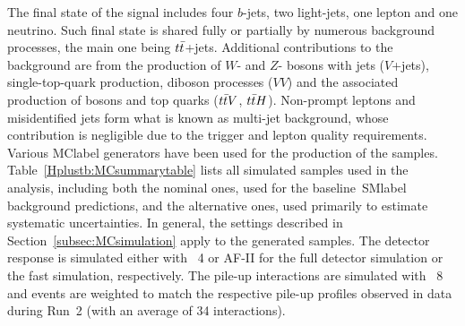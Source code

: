 The final state of the signal includes four $b$-jets, two light-jets, one lepton and one neutrino. Such final state is shared fully or partially by numerous background processes, the main one being $t\bar{t}$+jets. Additional contributions to the background are from the production of $W$- and $Z$- bosons with jets ($V$+jets), single-top-quark production, diboson processes ($VV$) and the associated production of bosons and top quarks ($t\bar{t} V$, $t\bar{t} H$). Non-prompt leptons and misidentified jets form what is known as multi-jet background, whose contribution is negligible due to the trigger and lepton quality requirements.\\ %

Various \acrshort{MClabel} generators have been used for the production of the samples. Table~\ref{Hplustb:MCsummarytable} lists all simulated samples used in the analysis, including both the nominal ones, used for the baseline~\acrshort{SMlabel} background predictions, and the alternative ones, used primarily to estimate systematic uncertainties. In general, the settings described in Section~\ref{subsec:MCsimulation} apply to the generated samples. The detector response is simulated either with \GEANT~4 or AF-II for the full detector simulation or the fast simulation, respectively. The pile-up interactions are simulated with \PYTHIA~8 and events are weighted to match the respective pile-up profiles observed in data during Run~2 (with an average of 34 interactions).\\ %

